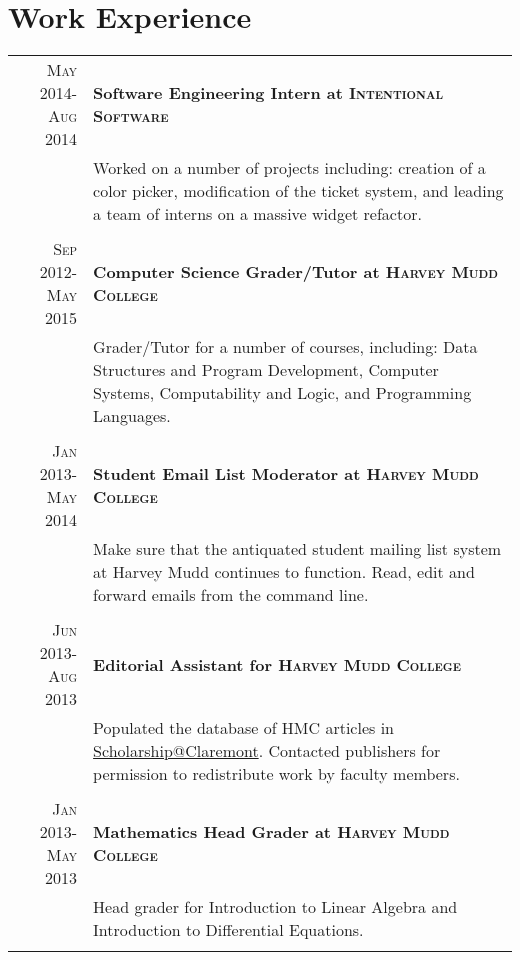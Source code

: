 \documentclass[letterpaper,10pt]{article} %
\newcommand{\work}[3]{ \textsc{#1} & \textbf{#2} \\
& #3\\
\multicolumn{2}{c}{} \\}
\begin{document}
\section{Work Experience}

\begin{tabular}{r|p{14.5cm}} %


\work{May 2014-Aug 2014}{Software Engineering Intern at \textsc{Intentional Software}}{
	Worked on a number of projects including: creation of a color picker, modification of the ticket system, and
	leading a team of interns on a massive widget refactor.
}


\work{Sep 2012-May 2015}{Computer Science Grader/Tutor at \textsc{Harvey Mudd College}}{
	Grader/Tutor for a number of courses, including: Data Structures and Program Development, Computer Systems, Computability and Logic, and Programming Languages.
}


\work{Jan 2013-May 2014}{Student Email List Moderator at \textsc{Harvey Mudd College}}{
	Make sure that the antiquated student mailing list system at Harvey Mudd continues to function. Read, edit and forward emails from the command line.
}


\work{Jun 2013-Aug 2013}{Editorial Assistant for \textsc{Harvey Mudd College}}{
	Populated the database of HMC articles in \href{scholarship.claremont.edu}{Scholarship@Claremont}. Contacted publishers for permission to redistribute work by faculty members.
}


\work{Jan 2013-May 2013}{Mathematics Head Grader at \textsc{Harvey Mudd College}}{
	Head grader for Introduction to Linear Algebra and Introduction to Differential Equations.
}

\end{tabular}
\vspace{-3mm} %

\end{document}

